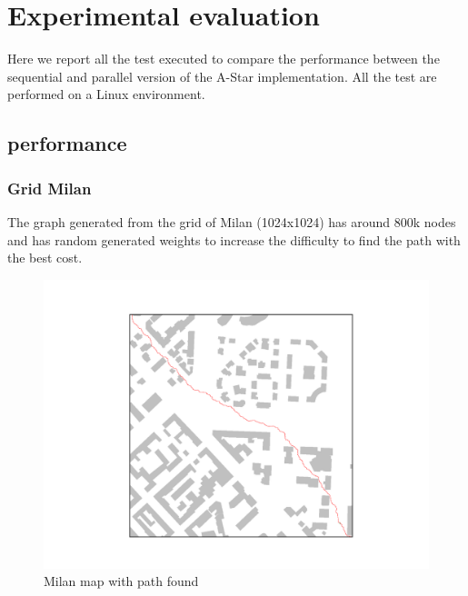 \section{Experimental evaluation}
\label{Sec:experimental-eval}

Here we report all the test executed to compare the performance between the sequential and parallel version of the A-Star implementation.
All the test are performed on a Linux environment.

\subsection{performance}

\subsubsection{Grid Milan}
The graph generated from the grid of Milan (1024x1024) has around 800k nodes and has random generated weights to increase the difficulty to find the path with the best cost.

\begin{figure}
    \centering
    \includegraphics[scale=0.7]{../assets/gridMilan.png}
    \caption{Milan map with path found}
    \label{Milan grid}
\end{figure}

